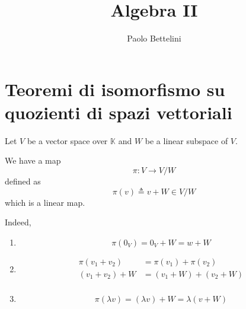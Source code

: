 \documentclass[a4paper]{article}
\title{Algebra II}
\author{Paolo Bettelini}
\date{}
\begin{document}
\maketitle
\tableofcontents

\section{Teoremi di isomorfismo su quozienti di spazi vettoriali}

Let \(V\) be a vector space over \(\mathbb{K}\)
and \(W\) be a linear subspace of \(V\).

We have a map
\[
    \pi \colon V \to V/W
\]
defined as
\[
    \pi(v) \triangleq v + W \in V/W
\]
which is a linear map.

Indeed,
\begin{enumerate}
    \item \[
            \pi(0_V) = 0_V + W = w + W
        \]
    \item
        \begin{align*}
            \pi(v_1 + v_2) &= \pi(v_1) + \pi(v_2) \\
            (v_1 + v_2) + W &= (v_1 + W) + (v_2 + W) \\
        \end{align*}
    \item \[
            \pi(\lambda v) = (\lambda v) + W = \lambda \left(v + W\right)
        \]
\end{enumerate}
\end{document}
